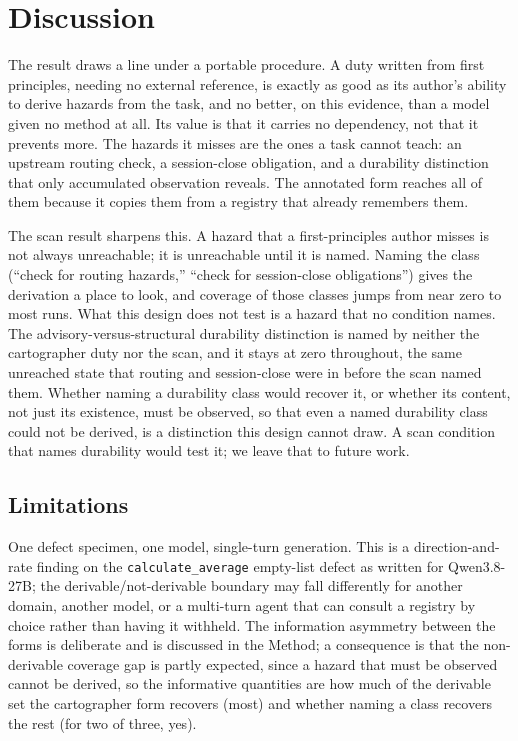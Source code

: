 \documentclass[11pt,a4paper]{article}
\begin{document}
\section{Discussion}

The result draws a line under a portable procedure. A duty written from first
principles, needing no external reference, is exactly as good as its author's
ability to derive hazards from the task, and no better, on this evidence, than
a model given no method at all. Its value is that it carries no dependency, not
that it prevents more. The hazards it misses are the ones a task cannot teach:
an upstream routing check, a session-close obligation, and a durability
distinction that only accumulated observation reveals. The annotated form
reaches all of them because it copies them from a registry that already
remembers them.

The scan result sharpens this. A hazard that a first-principles author misses is
not always unreachable; it is unreachable until it is named. Naming the class
(``check for routing hazards,'' ``check for session-close obligations'')
gives the derivation a place to look, and coverage of those classes jumps from
near zero to most runs. What this design does not test is a hazard that no condition names. The
advisory-versus-structural durability distinction is named by neither the
cartographer duty nor the scan, and it stays at zero throughout, the same
unreached state that routing and session-close were in before the scan named
them. Whether naming a durability class would recover it, or whether its content,
not just its existence, must be observed, so that even a named durability class
could not be derived, is a distinction this design cannot draw. A scan condition
that names durability would test it; we leave that to future work.

\subsection{Limitations}\label{sec:limitations}

One defect specimen, one model, single-turn generation. This is a
direction-and-rate finding on the \texttt{calculate\_average} empty-list defect
as written for Qwen3.8-27B; the derivable/not-derivable boundary may fall
differently for another domain, another model, or a multi-turn agent that can
consult a registry by choice rather than having it withheld. The information
asymmetry between the forms is deliberate and is discussed in the Method; a
consequence is that the non-derivable coverage gap is partly expected, since a
hazard that must be observed cannot be derived, so the informative quantities
are how much of the derivable set the cartographer form recovers (most) and
whether naming a class recovers the rest (for two of three, yes).
\end{document}
